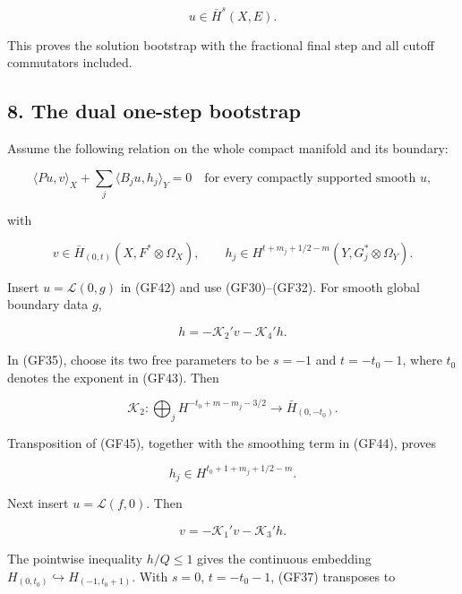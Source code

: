 \documentclass[
  11pt,
]{article}
\makeatletter
\let\ReaderOriginalAnchorStart\hyper@anchorstart
\let\ReaderOriginalAnchorEnd\hyper@anchorend
\let\ReaderPendingAliases\@empty
\def\ReaderArmAliases#1{\gdef\ReaderPendingAliases{#1}}
\def\hyper@anchorstart#1{\ReaderIfNativeAnchorTF{#1}{\ReaderPendingAliases\global\let\ReaderPendingAliases\@empty}{}\ReaderOriginalAnchorStart{#1}}
\makeatother
\begin{document}
\[
 u\in\bar H^s(X,E).
 \tag{GF41}
\]

This proves the solution bootstrap with the fractional final step and
all cutoff commutators included.

\ReaderArmAliases{\ReaderOriginalAnchorStart{AN03-GCF-008}\ReaderOriginalAnchorEnd\begingroup\expandafter\def\csname @currentHref\endcsname{AN03-GCF-008}\label{AN03-GCF-008}\endgroup\ReaderOriginalAnchorStart{8-the-dual-one-step-bootstrap}\ReaderOriginalAnchorEnd\begingroup\expandafter\def\csname @currentHref\endcsname{8-the-dual-one-step-bootstrap}\label{8-the-dual-one-step-bootstrap}\endgroup\ReaderOriginalAnchorStart{the-dual-one-step-bootstrap}\ReaderOriginalAnchorEnd}
\subsection{8. The dual one-step
bootstrap}\label{the-dual-one-step-bootstrap}

Assume the following relation on the whole compact manifold and its
boundary:

\[
 \langle Pu,v\rangle_X+\sum_j\langle B_ju,h_j\rangle_Y=0
 \quad\text{for every compactly supported smooth }u,
 \tag{GF42}
\]

with

\[
 v\in\bar H_{(0,t)}(X,F^*\otimes\Omega_X),
 \qquad
 h_j\in H^{t+m_j+1/2-m}(Y,G_j^*\otimes\Omega_Y).
 \tag{GF43}
\]

Insert \(u=\mathscr L(0,g)\) in (GF42) and use (GF30)--(GF32). For
smooth global boundary data \(g\),

\[
 h=-\mathscr K_2'v-\mathscr K_4'h.
 \tag{GF44}
\]

In (GF35), choose its two free parameters to be \(s=-1\) and
\(t=-t_{\!0}-1\), where \(t_{\!0}\) denotes the exponent in (GF43). Then

\[
 \mathscr K_2:
 \bigoplus_jH^{-t_{\!0}+m-m_j-3/2}
 \longrightarrow\bar H_{(0,-t_{\!0})}.
 \tag{GF45}
\]

Transposition of (GF45), together with the smoothing term in (GF44),
proves

\[
 h_j\in H^{t_{\!0}+1+m_j+1/2-m}.
 \tag{GF46}
\]

Next insert \(u=\mathscr L(f,0)\). Then

\[
 v=-\mathscr K_1'v-\mathscr K_3'h.
 \tag{GF47}
\]

The pointwise inequality \(h/Q\leq1\) gives the continuous embedding
\(H_{(0,t_{\!0})}\hookrightarrow H_{(-1,t_{\!0}+1)}\). With \(s=0\),
\(t=-t_{\!0}-1\), (GF37) transposes to
\end{document}
